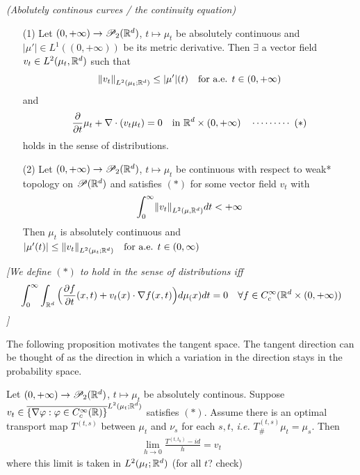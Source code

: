 \documentclass[12pt,a4paper]{article}
\begin{document}
 \emph{(Abolutely continous curves / the continuity equation)}
\begin{itemize}
\item[(1)] Let $(0, + \infty) \rightarrow \mathscr{P}_2(\mathbb{R}^d)$, $t\mapsto \mu_t$ be absolutely continuous and $|\mu'| \in L^1((0, + \infty))$ be its metric derivative. Then $\exists$ a vector field $v_t \in L^2(\mu_t, \mathbb{R}^d)$ such that 
\begin{align*}
\snorms{v_t}{L^2(\mu_t;\reals^d)} \leq |\mu'|(t) \quad \text{for a.e. }t\in (0, + \infty)
\end{align*}
and
\begin{align*}
\frac{\partial}{\partial t} \mu_t + \nabla \cdot (v_t \mu_t) =0 \quad \text{in }\mathbb{R}^d \times(0, + \infty)  \quad \cdots\cdots\cdots\,\,(*)
\end{align*}
holds in the sense of distributions.
\item[(2)] Let $(0, +\infty) \rightarrow \mathscr{P}_2(\mathbb{R}^d)$, $t\mapsto \mu_t$ be continuous with respect to weak* topology on $\mathscr{P}(\mathbb{R}^d)$ and satisfies $(*)$ for some vector field $v_t$ with
\begin{align*}
\int_0^{\infty} \snorms{v_t}{L^2(\mu, \reals^d)} dt < +\infty
\end{align*}
Then $\mu_t$ is absolutely continuous and $|\mu'(t)| \leq \snorms{v_t}{L^2(\mu_t ; \reals^d)} \quad \text{for a.e. }t\in (0, \infty)$
\end{itemize}
\emph{[We define $(*)$ to hold in the sense of distributions iff
\begin{align*}
\int_0^{\infty} \int_{\mathbb{R}^d} \Big( \frac{\partial f}{\partial t}(x, t) + v_t(x) \cdot \nabla f(x,t) \Big) d\mu_(x) dt =0 \quad \forall f\in C_c^{\infty}(\mathbb{R}^d \times (0, +\infty))
\end{align*}]}
\s

The following proposition motivates the tangent space. The tangent direction can be thought of as the direction in which a variation in the direction stays in the probability space.
\s

 Let $(0, +\infty) \rightarrow \mathscr{P}_2(\mathbb{R}^d)$, $t\mapsto \mu_t$ be absolutely continous. Suppose $v_t \in \overline{ \{\nabla \varphi : \varphi \in C_c^{\infty}(\mathbb{R})\}}^{L^2(\mu_t ; \mathbb{R}^d)}$ satisfies $(*)$. Assume there is an optimal transport map $T^{(t,s)}$ between $\mu_t$ and $\nu_s$ for each $s,t$, \textit{i.e.} $T_{\#}^{(t,s)} \mu_t = \mu_s$. Then
\begin{align*}
\lim_{h\rightarrow 0} \frac{T^{(t, t_h)}- id}{h} = v_t
\end{align*}
where this limit is taken in $L^2(\mu_t ; \mathbb{R}^d)$ (for all $t$? check) 
\s
\end{document}
